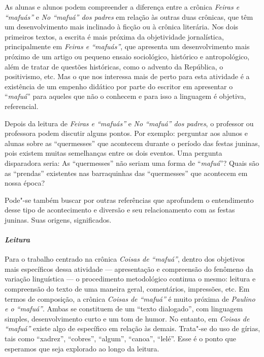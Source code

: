 \documentclass{extarticle}
\begin{document}
As alunas e alunos podem compreender a diferença entre a crônica
{\textit{Feiras e ``mafuás''}} e \textit{\emph{No ``mafuá'' dos
padres}} em relação às outras duas crônicas, que têm um desenvolvimento
mais inclinado à ficção ou à crônica literária. Nos dois primeiros
textos, a escrita é mais próxima da objetividade jornalística,
principalmente em {\textit{Feiras e ``mafuás''}}, que apresenta um
desenvolvimento mais próximo de um artigo ou pequeno ensaio sociológico,
histórico e antropológico, além de tratar de questões históricas, como o
advento da República, o positivismo, etc. Mas o que nos interessa mais
de perto para esta atividade é a existência de um empenho didático por
parte do escritor em apresentar o ``\emph{mafuá}'' para aqueles que não
o conhecem e para isso a linguagem é objetiva, referencial.





Depois da leitura de \textit{\emph{Feiras e ``mafuás''}} e
{\textit{No ``mafuá'' dos padres}}, o professor ou professora podem
discutir alguns pontos. Por exemplo: perguntar aos alunos e alunas sobre
as ``quermesses'' que acontecem durante o período das festas juninas,
pois existem muitas semelhanças entre os dois eventos. Uma pergunta
disparadora seria: As ``quermesses'' não seriam uma forma de
``\emph{mafuá}''? Quais são as ``prendas'' existentes nas barraquinhas
das ``quermesses'' que acontecem em nossa época?

Pode"-se também buscar por outras referências que aprofundem o
entendimento desse tipo de acontecimento e diversão e seu relacionamento
com as festas juninas. Suas origens, significados.

\paragraph{\textit{Leitura}}


Para o trabalho centrado na crônica {\textit{Coisas de ``mafuá''}},
dentro dos objetivos mais específicos dessa atividade --- apresentação e
compreensão do fenômeno da variação linguística --- o procedimento
metodológico continua o mesmo: leitura e compreensão do texto de uma
maneira geral, comentários, impressões, etc. Em termos de composição, a
crônica {\textit{Coisas de ``mafuá''}} é muito próxima de
{\textit{Paulino e o ``mafuá''}}. Ambas se constituem de um ``texto
dialogado'', com linguagem simples, desenvolvimento curto e um tom de
humor. No entanto, em {\textit{Coisas de ``mafuá''}} existe algo de
específico em relação às demais. Trata"-se do uso de gírias, tais como
``xadrez'', ``cobres'', ``algum'', ``canoa'', ``lelé''. Esse é o ponto
que esperamos que seja explorado ao longo da leitura.
\end{document}

